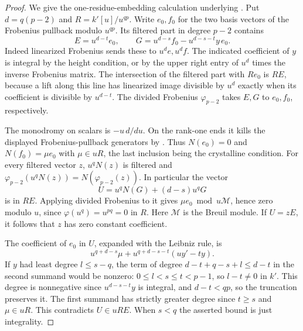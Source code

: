 \documentclass[a4paper,11pt]{article}
\theoremstyle{definition}
\theoremstyle{remark}
\numberwithin{equation}{section}
\begin{document}
\begin{proof}
We give the one-residue-embedding calculation underlying
\cite[Lemma~2.2.7]{III-II-bcgntmonodromy752}. Put \(d=q(p-2)\) and
\(R=k'[u]/u^{qp}\). Write \(e_0,f_0\) for the two basis vectors
of the Frobenius pullback modulo \(u^{qp}\). Its filtered part
in degree \(p-2\) contains
\[
 E=u^{d-t}e_0,\qquad
 G=u^{d-s}f_0-u^{d-s-t}y\,e_0 .
\]
Indeed linearized Frobenius sends these to \(u^d e,u^d f\).
The indicated coefficient of \(y\) is integral by the height
condition, or by the upper right entry of \(u^d\) times the
inverse Frobenius matrix. The intersection of the filtered part
with \(R e_0\) is \(R E\), because a lift along this line has
linearized image divisible by \(u^d\) exactly when its
coefficient is divisible by \(u^{d-t}\). The divided Frobenius
\(\varphi_{p-2}\) takes \(E,G\) to \(e_0,f_0\), respectively.

The monodromy on scalars is \(-u\,d/du\). On the rank-one ends
it kills the displayed Frobenius-pullback generators by
\cite[Lemma~2.2.3]{III-II-bcgntmonodromy752}. Thus \(N(e_0)=0\) and
\(N(f_0)=\mu e_0\) with \(\mu\in uR\), the last inclusion being
the crystalline condition. For every filtered vector \(z\),
\(u^qN(z)\) is filtered and
\(\varphi_{p-2}(u^qN(z))=N(\varphi_{p-2}(z))\).
In particular the vector
\[
 U=u^qN(G)+(d-s)u^qG
\]
is in \(R E\). Applying divided Frobenius to it gives
\(\mu e_0\bmod u\mathcal M\), hence zero modulo \(u\), since
\(\varphi(u^q)=u^{pq}=0\) in \(R\). Here \(\mathcal M\) is
the Breuil module. If \(U=zE\), it follows that \(z\) has
zero constant coefficient.

The coefficient of \(e_0\) in \(U\), expanded with the Leibniz
rule, is
\[
     u^{q+d-s}\mu+u^{q+d-s-t}(u y'-t y).
\]
If \(y\) had least degree \(l\le s-q\), the term of degree
\(d-t+q-s+l\le d-t\) in the second summand would be nonzero:
\(0\le l<s\le t<p-1\), so \(l-t\ne0\) in \(k'\).
This degree is nonnegative since \(u^{d-s-t}y\) is integral,
and \(d-t<qp\), so the truncation preserves it.
The first summand has strictly greater degree since \(t\ge s\)
and \(\mu\in uR\). This contradicts \(U\in u R E\).
When \(s<q\) the asserted bound is just integrality.
\end{proof}
\end{document}
